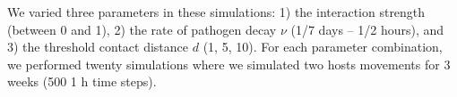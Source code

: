 ﻿\documentclass[11pt]{article}
\begin{document}
We varied three parameters in these simulations: 1) the interaction strength (between 0 and 1), 2) the rate of pathogen decay $\nu$ (1/7 days -- 1/2 hours), and 3) the threshold contact distance $d$ (1, 5, 10). For each parameter combination, we performed twenty simulations where we simulated two hosts movements for 3 weeks (500 1 h time steps). 


% 
% 





\end{document}
